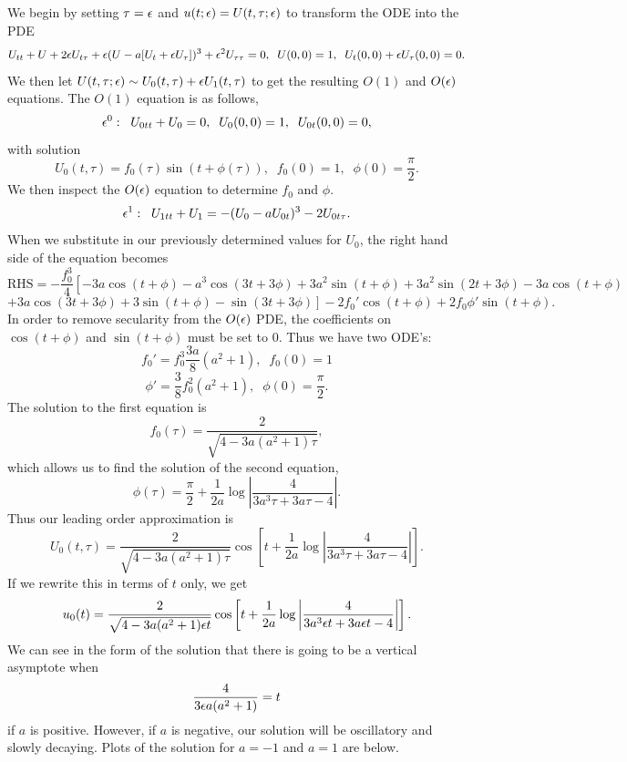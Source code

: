 We begin by setting $\tau=\epsilon$ and $u(t;\epsilon)=U(t,\tau;\epsilon)$ to transform the ODE into the PDE
$$U_{tt}+U+2\epsilon U_{t\tau}+\epsilon(U-a[U_t+\epsilon U_\tau])^3+\epsilon^2U_{\tau\tau}=0,\;\;U(0,0)=1,\;\;U_t(0,0)+\epsilon U_\tau(0,0)=0.$$
We then let $U(t,\tau;\epsilon)\sim U_0(t,\tau)+\epsilon U_1(t,\tau)$ to get the resulting $O(1)$ and $O(\epsilon)$ equations. The $O(1)$ equation is as follows,
$$\epsilon^0:\;\;U_{0tt}+U_0=0,\;\;U_0(0,0)=1,\;\;U_{0t}(0,0)=0,$$
with solution
$$U_0(t,\tau)=f_0(\tau)\sin(t+\phi(\tau)),\;\;f_0(0)=1,\;\;\phi(0)=\frac{\pi}{2}.$$
We then inspect the $O(\epsilon)$ equation to determine $f_0$ and $\phi$.
$$\epsilon^1:\;\;U_{1tt}+U_1=-(U_0-aU_{0t})^3-2U_{0t\tau}.$$
When we substitute in our previously determined values for $U_0$, the right hand side of the equation becomes
$$\text{RHS}=-\frac{f_0^3}{4}\left[-3a\cos(t+\phi)-a^3\cos(3t+3\phi)+3a^2\sin(t+\phi)+3a^2\sin(2t+3\phi)-3a\cos(t+\phi)\right.$$
$$\left.+3a\cos(3t+3\phi)+3\sin(t+\phi)-\sin(3t+3\phi)\right]-2f_0'\cos(t+\phi)+2f_0\phi'\sin(t+\phi).$$
In order to remove secularity from the $O(\epsilon)$ PDE, the coefficients on $\cos(t+\phi)$ and $\sin(t+\phi)$ must be set to 0. Thus we have two ODE's:
$$f_0'=f_0^3\frac{3a}{8}(a^2+1),\;\;f_0(0)=1$$
$$\phi'=\frac{3}{8}f_0^2(a^2+1),\;\;\phi(0)=\frac{\pi}{2}.$$
The solution to the first equation is
$$f_0(\tau)=\frac{2}{\sqrt{4-3a(a^2+1)\tau}},$$
which allows us to find the solution of the second equation,
$$\phi(\tau)=\frac{\pi}{2}+\frac{1}{2a}\log\left|\frac{4}{3a^3\tau+3a\tau-4}\right|.$$
Thus our leading order approximation is
$$U_0(t,\tau)=\frac{2}{\sqrt{4-3a(a^2+1)\tau}}\cos\left[t+\frac{1}{2a}\log\left|\frac{4}{3a^3\tau+3a\tau-4}\right|\right].$$
If we rewrite this in terms of $t$ only, we get
$$u_0(t)=\frac{2}{\sqrt{4-3a(a^2+1)\epsilon t}}\cos\left[t+\frac{1}{2a}\log\left|\frac{4}{3a^3\epsilon t+3a\epsilon t-4}\right|\right].$$
We can see in the form of the solution that there is going to be a vertical asymptote when
$$\frac{4}{3 \epsilon a(a^2+1)}=t$$
if $a$ is positive. However, if $a$ is negative, our solution will be oscillatory and slowly decaying. Plots of the solution for $a=-1$ and $a=1$ are below.

